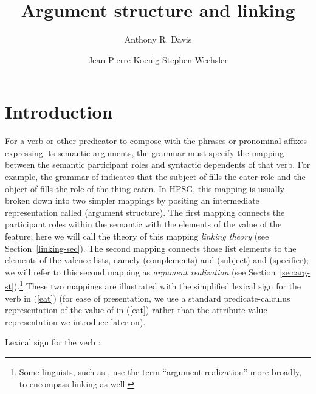 \documentclass[output=paper,biblatex,babelshorthands,newtxmath,draftmode,colorlinks, citecolor=brown]{langscibook}
\author{Anthony R. Davis\affiliation{Southern Oregon University} \and Jean-Pierre Koenig\affiliation{University at Buffalo} \lastand Stephen Wechsler\affiliation{The University of Texas}}
\title{Argument structure and linking}
\begin{document}
\maketitle
\label{chap:argumentstr}\label{chap-argumentstr}\label{chap-arg-st}

\section{Introduction}


For a verb or other predicator to compose with the phrases or pronominal affixes expressing its
semantic arguments, the grammar must specify the mapping between the semantic participant
roles and syntactic dependents
of that verb.  For example, the grammar of  indicates that the subject of 
fills the eater role and the object of   fills the role of the thing eaten.  In HPSG, this
mapping is usually broken down into two simpler mappings by positing an intermediate representation
called \argst (argument structure).  The first mapping connects the participant roles within the
semantic \content with the elements of the value of the \argst feature; here we will call the theory
of this mapping \emph{linking theory} (see Section~\ref{linking-sec}).  The second mapping connects
those \argst list elements to the elements of the valence lists, namely \comps
(complements) and \subj (subject) and  \spr (specifier); we will refer to this second mapping as
\emph{argument realization} (see Section~\ref{sec:arg-st}).\footnote{Some linguists, such as
  \citet{LevinandRappaport2005}, use the term ``argument realization'' more broadly, to encompass
  linking as well.}  
These two mappings are
illustrated with the simplified lexical sign for the verb  in (\ref{eat}) (for ease of
presentation, we use a standard predicate-calculus representation of the value of \content in
(\ref{eat}) rather than the attribute-value representation we introduce later on).  


\ea
\label{eat}
Lexical sign for the verb :\\
\z
\end{document}
